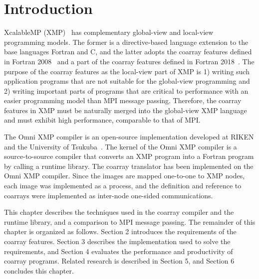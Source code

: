 \section{Introduction}\label{chap:intro}

\setcounter{page}{1}

XcalableMP (XMP)~\cite{xmp} has complementary global-view and local-view 
programming models. The former is a directive-based language 
extension to the base languages Fortran and C, and the latter adopts 
the coarray features defined in Fortran 2008~\cite{coarray} and 
a part of the coarray features defined in Fortran 2018~\cite{coarray18}. 
%
The purpose of the coarray features as the local-view part of XMP is 
1) writing such application programs that are not suitable for the global-view programming
and 2) writing important parts of programs that are critical to performance
with an easier programming model than MPI message passing.
Therefore, the coarray features in XMP must be naturally merged into the 
global-view XMP language and must exhibit high performance, comparable to that of MPI.

The Omni XMP compiler is an open-source implementation developed at RIKEN 
and the University of Tsukuba~\cite{omni}. 
The kernel of the Omni XMP compiler is a source-to-source compiler that 
converts an XMP program into a Fortran program by calling a runtime library.
%
The coarray translator has been implemented on the Omni XMP compiler.
Since the images are mapped one-to-one to XMP nodes, 
each image was implemented as a process, and the definition and reference 
to coarrays were implemented as inter-node one-sided communications.

This chapter describes the techniques used in the coarray compiler and 
the runtime library, and a comparison to MPI message passing.
The remainder of this chapter is organized as follows. 
Section 2 introduces the requirements of the coarray features.
Section 3 describes the implementation used to solve the requirements, and
Section 4 evaluates the performance and productivity of coarray programs.
Related research is described in Section 5, and Section 6 concludes this chapter.


